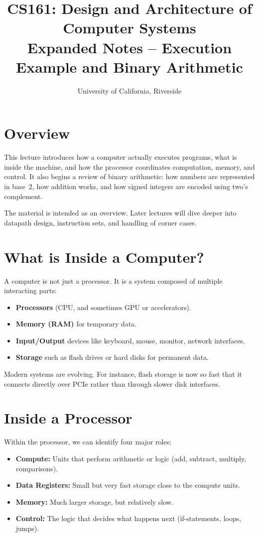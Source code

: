 \documentclass[11pt]{article}
\begin{document}
\title{CS161: Design and Architecture of Computer Systems \\[4pt]
Expanded Notes -- Execution Example and Binary Arithmetic}
\author{University of California, Riverside}
\date{}
\maketitle

\section*{Overview}
This lecture introduces how a computer actually executes programs, what is inside the machine, and how the processor coordinates computation, memory, and control. It also begins a review of binary arithmetic: how numbers are represented in base~2, how addition works, and how signed integers are encoded using two’s complement. 

The material is intended as an overview. Later lectures will dive deeper into datapath design, instruction sets, and handling of corner cases.

\section*{What is Inside a Computer?}
A computer is not just a processor. It is a system composed of multiple interacting parts:
\begin{itemize}
  \item \textbf{Processors} (CPU, and sometimes GPU or accelerators).
  \item \textbf{Memory (RAM)} for temporary data.
  \item \textbf{Input/Output} devices like keyboard, mouse, monitor, network interfaces.
  \item \textbf{Storage} such as flash drives or hard disks for permanent data.
\end{itemize}

Modern systems are evolving. For instance, flash storage is now so fast that it connects directly over PCIe rather than through slower disk interfaces.

\section*{Inside a Processor}
Within the processor, we can identify four major roles:
\begin{itemize}
  \item \textbf{Compute:} Units that perform arithmetic or logic (add, subtract, multiply, comparisons).
  \item \textbf{Data Registers:} Small but very fast storage close to the compute units.
  \item \textbf{Memory:} Much larger storage, but relatively slow.
  \item \textbf{Control:} The logic that decides what happens next (if-statements, loops, jumps).
\end{itemize}
\end{document}
